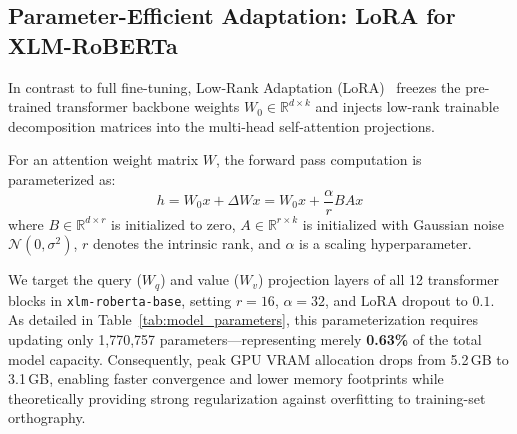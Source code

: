 \subsection{Parameter-Efficient Adaptation: LoRA for XLM-RoBERTa}
In contrast to full fine-tuning, Low-Rank Adaptation (LoRA)~\cite{hu2022lora} freezes the pre-trained transformer backbone weights $W_0 \in \mathbb{R}^{d \times k}$ and injects low-rank trainable decomposition matrices into the multi-head self-attention projections. 

For an attention weight matrix $W$, the forward pass computation is parameterized as:
\begin{equation}
    h = W_0 x + \Delta W x = W_0 x + \frac{\alpha}{r} B A x
\end{equation}
where $B \in \mathbb{R}^{d \times r}$ is initialized to zero, $A \in \mathbb{R}^{r \times k}$ is initialized with Gaussian noise $\mathcal{N}(0, \sigma^2)$, $r$ denotes the intrinsic rank, and $\alpha$ is a scaling hyperparameter. 

We target the query ($W_q$) and value ($W_v$) projection layers of all 12 transformer blocks in \texttt{xlm-roberta-base}, setting $r=16$, $\alpha=32$, and LoRA dropout to $0.1$. As detailed in Table~\ref{tab:model_parameters}, this parameterization requires updating only 1,770,757 parameters---representing merely \textbf{0.63\%} of the total model capacity. Consequently, peak GPU VRAM allocation drops from 5.2\,GB to 3.1\,GB, enabling faster convergence and lower memory footprints while theoretically providing strong regularization against overfitting to training-set orthography.

\begin{table}[htbp]
\caption{Architectural and Training Parameter Comparison}
\label{tab:model_parameters}
\centering
{}
\end{table}

